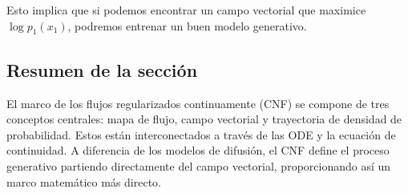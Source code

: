 Esto implica que si podemos encontrar un campo vectorial que maximice $\log p_1(x_1)$, podremos entrenar un buen modelo generativo.

\subsection{Resumen de la sección}

El marco de los flujos regularizados continuamente (CNF) se compone de tres conceptos centrales: mapa de flujo, campo vectorial y trayectoria de densidad de probabilidad. Estos están interconectados a través de las ODE y la ecuación de continuidad. A diferencia de los modelos de difusión, el CNF define el proceso generativo partiendo directamente del campo vectorial, proporcionando así un marco matemático más directo.


